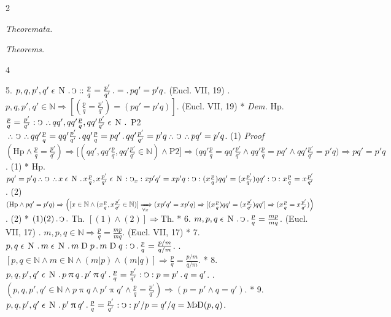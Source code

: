 \documentclass{book}
\newcommand{\s}{\switchcolumn} %
\newcommand{\C}{\mathop{\sbox0{$\displaystyle$$\reflectbox{C}$} %
\raisebox{-\height+\ht0-0.05cm}[\ht0][\dp0]{\scalebox{0.8}[0.8]{\copy0}}}\displaylimits} %
\newcommand{\p}{\mathop{\sbox0{$\displaystyle$$.$}
\raisebox{-\height+\ht0}[\ht0][\dp0]{\scalebox{1}[1]{\copy0}}}\displaylimits} %
\newcommand{\pppNoSpace}{\leavevmode\lower0ex\hbox{.}\kern-0.1em\raise0.7ex\hbox{.}\kern-0.1em\lower0ex\hbox{.}} %
\newcommand{\ppp}{\thinspace \pppNoSpace\thinspace} %
\newcommand{\smallIn}{\ensuremath{\mathrel{\epsilon}}}
\newcommand{\primeWith}{\ensuremath{\mathbin{\uppi}}}
\newcommand{\maxDiv}{\mathop{\text{M}\mkern-1mu\rotatebox[origin=c]{180}{$\epsilon$}\mkern-1mu\text{D}}}
\newcommand{\D}{\mathrel{\text{D}}}
\newcommand{\N}{\mathop{\thinspace \text{N} \thinspace}}
\renewcommand{\rightarrow}{\Rightarrow}
\renewcommand{\xrightarrow}{\xRightarrow}
\newcommand\peanoHeadingSmall[1]{ \vspace{0.75cm} \textit{#1} \nopagebreak[4]

\vspace{0.25cm} \nopagebreak[1]}
\newenvironment{translateTwoCol}
               { %
                 \columnratio{0.5, 0.5}
                 \begin{paracol}{2}
                 \newcommand{\LAT}{\switchcolumn[0]*}
                 \newcommand{\ENG}{\switchcolumn[1]}
               }
               { %
                 \let\ENG\undefined
                 \let\LAT\undefined
                 \end{paracol}
               }
\newenvironment{translateFourCol}[4]
               { %
                 \setcolumnwidth{#1\fill/1em, #2\fill/\columnsep, #3\fill/1em, #4\fill}
                 \begin{paracol}{4}
                 \newcommand{\LAT}{\switchcolumn[0]*}
                 \newcommand{\ENG}{\switchcolumn[2]}
               }
               { %
                 \let\ENG\undefined
                 \let\LAT\undefined
                 \end{paracol}
               }
\begin{document}
\begin{translateTwoCol}
\centering
{}
{}
\peanoHeadingSmall{Theoremata.}
\s
\peanoHeadingSmall{Theorems.}
\end{translateTwoCol}

\begin{translateFourCol}{0.08}{0.42}{0.08}{0.42}
\raggedright
5. \s $p,q,p',q' \smallIn \N \p \C :: \frac{p}{q} = \frac{p'}{q'} \p = \p pq' = p'q$. \hfill (Eucl. VII, 19)
\ENG
5. \s $p,q,p',q' \in \mathbb{N} \rightarrow [(\frac{p}{q} = \frac{p'}{q'}) = (pq' = p'q)]$. \hfill (Eucl. VII, 19)
\LAT
\emph{Dem.} \s Hp. $\frac{p}{q} = \frac{p'}{q'} : \C \ppp qq', qq' \frac{p}{q}, qq' \frac{p'}{q'} \smallIn \N \p$ P2 $\ppp \C \ppp qq' \frac{p}{q} = qq' \frac{p'}{q'} \p qq' \frac{p}{q} = pq' \p qq' \frac{p'}{q'} = p'q \ppp \C \ppp pq' = p'q$. \hfill (1)
\ENG
\emph{Proof} \s $(\text{Hp} \wedge \frac{p}{q} = \frac{p'}{q'}) \rightarrow \Big[ (qq', qq' \frac{p}{q}, qq' \frac{p'}{q'} \in \mathbb{N}) \wedge \text{P2} \Big] \rightarrow \Big( qq' \frac{p}{q} = qq' \frac{p'}{q'} \wedge qq' \frac{p}{q} = pq' \wedge qq' \frac{p'}{q'} = p'q \Big) \rightarrow pq' = p'q$. \hfill (1)
\LAT
\s Hp. $pq' = p'q \ppp \C \ppp x \smallIn \N \p x \frac{p}{q}, x \frac{p'}{q'} \smallIn \N : \C_x : x p'q' = x p'q : \C : (x \frac{p}{q}) qq' = (x \frac{p'}{q'}) qq' : \C : x \frac{p}{q} = x \frac{p'}{q'}$. \hfill (2)
\ENG
\s $(\text{Hp} \wedge pq' = p'q) \rightarrow \Big( [x \in \mathbb{N} \wedge (x \frac{p}{q}, x \frac{p'}{q'} \in \mathbb{N})] \xrightarrow[\forall x]{} (x p'q' = x p'q) \rightarrow [(x \frac{p}{q}) qq' = (x \frac{p'}{q'}) qq'] \rightarrow (x \frac{p}{q} = x \frac{p'}{q'}) \Big)$. \hfill (2)
\LAT
\s $(1)(2) \p \C \p$ Th.
\ENG
\s $[(1) \wedge (2)] \rightarrow \text{Th}$.
\LAT
6. \s $m,p,q \smallIn \N \p \C \p \frac{p}{q} = \frac{mp}{mq}$. \hfill (Eucl. VII, 17)
\ENG
6. \s $m,p,q \in \mathbb{N} \rightarrow \frac{p}{q} = \frac{mp}{mq}$. \hfill (Eucl. VII, 17)
\LAT
7. \s $p,q \smallIn \N \p m \smallIn \N \p m \D p \p m \D q : \C \p \frac{p}{q} = \frac{p/m}{q/m}$.
\ENG
7. \s $[p,q \in \mathbb{N} \wedge m \in \mathbb{N} \wedge (m | p) \wedge (m | q)] \rightarrow \frac{p}{q} = \frac{p/m}{q/m}$.
\LAT
8. \s $p,q,p',q' \smallIn \N \p p \primeWith q \p p' \primeWith q' \p \frac{p}{q} = \frac{p'}{q'} : \C : p = p' \p q =q'$.
\ENG
8. \s $(p,q,p',q' \in \mathbb{N} \wedge p \primeWith q \wedge p' \primeWith q' \wedge \frac{p}{q} = \frac{p'}{q'}) \rightarrow (p = p' \wedge q = q')$.
\LAT
9. \s $p,q,p',q' \smallIn \N \p p' \primeWith q' \p \frac{p}{q} = \frac{p'}{q'} : \C : p' / p = q' / q = \maxDiv (p,q)$.

\end{translateFourCol}
\end{document}
